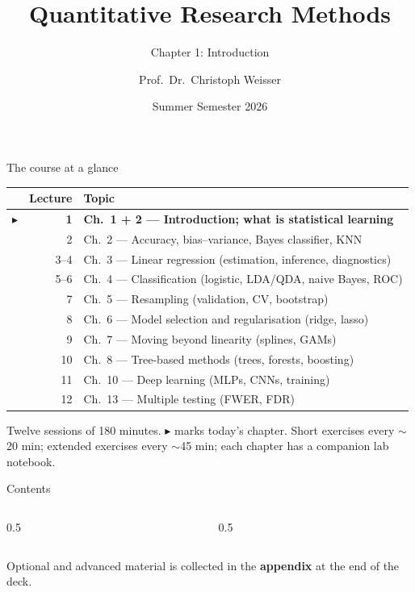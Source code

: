 \documentclass[aspectratio=169,11pt]{beamer}
\title{Quantitative Research Methods}
\subtitle{Chapter 1: Introduction}
\author{Prof.\ Dr.\ Christoph Weisser}\institute{HSBI}
\date{Summer Semester 2026}\graphicspath{{images/}}
\begin{document}
\begin{frame}[plain]\titlepage\end{frame}

\begin{frame}{The course at a glance}
  \footnotesize
  \begin{center}
  \begin{tabular}{@{}c r l@{}}
    & \textbf{Lecture} & \textbf{Topic}\\
    \midrule
    $\blacktriangleright$ & \textbf{1} & \textbf{Ch.\ 1 + 2 --- Introduction; what is statistical learning} \\
     & 2 & Ch.\ 2 --- Accuracy, bias--variance, Bayes classifier, KNN \\
     & 3--4 & Ch.\ 3 --- Linear regression (estimation, inference, diagnostics) \\
     & 5--6 & Ch.\ 4 --- Classification (logistic, LDA/QDA, naive Bayes, ROC) \\
     & 7 & Ch.\ 5 --- Resampling (validation, CV, bootstrap) \\
     & 8 & Ch.\ 6 --- Model selection and regularisation (ridge, lasso) \\
     & 9 & Ch.\ 7 --- Moving beyond linearity (splines, GAMs) \\
     & 10 & Ch.\ 8 --- Tree-based methods (trees, forests, boosting) \\
     & 11 & Ch.\ 10 --- Deep learning (MLPs, CNNs, training) \\
     & 12 & Ch.\ 13 --- Multiple testing (FWER, FDR) \\
  \end{tabular}
  \end{center}
  \vspace{2pt}
  {\scriptsize Twelve sessions of 180 minutes. $\blacktriangleright$ marks today's chapter. Short exercises every $\sim$20 min; extended exercises every $\sim$45 min; each chapter has a companion lab notebook.}
\end{frame}


\begin{frame}{Contents}
  \begin{columns}[t]
    \begin{column}{0.5\textwidth}
      \tableofcontents[hideallsubsections,sections={1-4}]
    \end{column}
    \begin{column}{0.5\textwidth}
      \tableofcontents[hideallsubsections,sections={5-8}]
    \end{column}
  \end{columns}
  \vfill
  {\tiny Optional and advanced material is collected in the \textbf{appendix} at the end of the deck.}
\end{frame}
\end{document}
